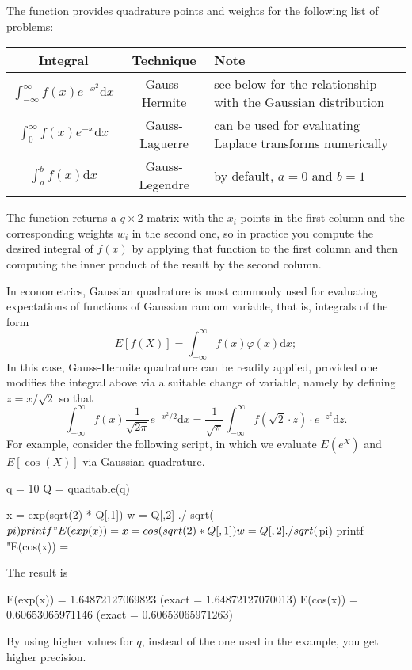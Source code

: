The  function provides quadrature points and weights
for the following list of problems:
\begin{center}
\begin{tabular}{ccp{}}
  \hline
  \textbf{Integral} & \textbf{Technique} & \textbf{Note}\\
  \hline
  $\int_{-\infty}^{\infty} f(x) e^{-x^2} \mathrm{d}x$ &
  Gauss-Hermite & see below for the relationship with the Gaussian distribution\\
  $\int_{0}^{\infty} f(x) e^{-x} \mathrm{d}x$ &
  Gauss-Laguerre & can be used for evaluating Laplace transforms numerically \\
  $\int_{a}^{b} f(x) \mathrm{d}x$ &
  Gauss-Legendre & by default, $a=0$ and $b=1$ \\
  \hline
\end{tabular}
\end{center}
The  function returns a $q \times 2$ matrix with the
$x_i$ points in the first column and the corresponding weights $w_i$
in the second one, so in practice you compute the desired integral of
$f(x)$ by applying that function to the first column and then
computing the inner product of the result by the second column.



In econometrics, Gaussian quadrature is most commonly used for
evaluating expectations of functions of Gaussian random variable, that
is, integrals of the form
\[
  E\left[f(X)\right] = \int_{-\infty}^{\infty} f(x) \varphi(x)
  \mathrm{d} x;
\]
In this case, Gauss-Hermite quadrature can be readily applied,
provided one modifies the integral above via a suitable change of
variable, namely by defining $z = x/\sqrt{2}$ so that
\[
  \int_{-\infty}^{\infty} f(x) \frac{1}{\sqrt{2 \pi}} e^{-x^2/2}
  \mathrm{d} x =
  \frac{1}{\sqrt{\pi}} \int_{-\infty}^{\infty} f(\sqrt{2} \cdot z)
  \cdot  e^{-z^2}
  \mathrm{d} z .
\]
For example, consider the following script, in which we evaluate
$E(e^X)$ and $E[\cos(X)]$ via Gaussian quadrature.
\begin{code}
q = 10
Q = quadtable(q)

x = exp(sqrt(2) * Q[,1])
w = Q[,2] ./ sqrt($pi) 
printf "E(exp(x)) = %

x = cos(sqrt(2) * Q[,1])
w = Q[,2] ./ sqrt($pi) 
printf "E(cos(x)) = %
\end{code}
The result is
\begin{code}
E(exp(x)) = 1.64872127069823 (exact = 1.64872127070013)
E(cos(x)) = 0.60653065971146 (exact = 0.60653065971263)
\end{code}
By using higher values for $q$, instead of the one used in the
example, you get higher precision.


